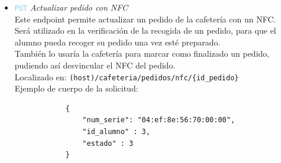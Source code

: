 \documentclass[12pt]{report}
\begin{document}
\begin{itemize}
\begin{itemize}
\begin{itemize}
            Localizado en: \texttt{(host)/nfc/\{id\_nfc\}}
            \\Ejemplo de cuerpo de la solicitud:
            \begin{verbatim}
            {
                "num_serie": "cq:15:93:vv"
            }
            \end{verbatim}
            \item \textcolor{SkyBlue}{\texttt{PUT}} \textit{Actualizar pedido con NFC}\\
            Este endpoint permite actualizar un pedido de la cafetería con un NFC.\\
            Será utilizado en la verificación de la recogida de un pedido, para que el alumno pueda recoger su pedido una vez esté preparado.\\
            También lo usaría la cafetería para marcar como finalizado un pedido, pudiendo así desvincular el NFC del pedido.\\
            Localizado en: \texttt{(host)/cafeteria/pedidos/nfc/\{id\_pedido\}}
            \\Ejemplo de cuerpo de la solicitud:
            \begin{verbatim}
            {
                "num_serie": "04:ef:8e:56:70:00:00",
                "id_alumno" : 3,
                "estado" : 3
            }
            \end{verbatim}
        \end{itemize}
    \end{itemize}
    
\end{itemize}
\end{document}
